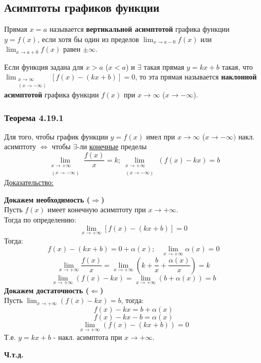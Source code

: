 \documentclass[12pt]{article}
\begin{document}
    \subsection{Асимптоты графиков функции}
    \noindent Прямая $x = a$ называется \textbf{вертикальной асимптотой} графика функции $y = f(x)$, если хотя бы один из пределов $\lim_{x\to a-0} f(x)$ или $\lim_{x\to a + 0} f(x)$ равен $\pm \infty$.\par\noindent
    Если функция задана для $x > a$ ($x < a$) и $\exists$ такая прямая $y = kx+b$ такая, что $\lim_{\substack{x \to \infty\\(x \to -\infty)}} [ f(x) - (kx+b) ] = 0$, то эта прямая называется \textbf{наклонной асимптотой} графика функции $f(x)$ при $x \to \infty$ ($x \to -\infty$).
    
    \subsubsection*{Теорема 4.19.1}\label{th:4.19.1}
    Для того, чтобы график функции $y = f(x)$ имел при $x \to \infty$ ($x \to -\infty)$ накл. асимптоту $\Longleftrightarrow$ чтобы $\exists$-ли \underline{конечные} пределы
    \[ \lim_{\substack{x\to +\infty\\(x \to -\infty)}} \frac{f(x)}{x} = k; \lim_{\substack{x\to +\infty\\(x \to -\infty)}} (f(x) - kx) = b \]
    \underline{Доказательство:}
    \begin{adjustwidth}{1.5em}{1.5em}
        \textbf{Докажем необходимость ($\Rightarrow$)}\\
        Пусть $f(x)$ имеет конечную асимптоту при $x \to +\infty$.\\
        Тогда по определению:
        \[ \lim_{x\to +\infty} [ f(x) - (kx+b) ] = 0 \]
        Тогда:
        \[ f(x) - (kx+b) = 0 + \alpha(x); \;\;\; \lim_{x \to +\infty} \alpha(x) = 0 \]
        \[ \lim_{x \to +\infty}\frac{f(x)}{x} = \lim_{x\to +\infty} (k + \frac{b}{x} + \frac{\alpha(x)}{x}) = k \]
        \[ \lim_{x \to +\infty} (f(x) - kx) = \lim_{x \to +\infty}(b + \alpha(x)) = b \]\noindent
        \textbf{Докажем достаточность ($\Leftarrow$)}\\
        Пусть $\lim_{x\to +\infty} (f(x) - kx) = b$, тогда:
        \[f(x) - kx = b + \alpha(x)\]
        \[f(x) - kx - b = \alpha(x)\]
        \[ \lim_{x\to +\infty} (f(x) - (kx+b)) = 0 \]
        Т.е. $y = kx+b$ - накл. асимптота при $x \to +\infty$.
        \begin{center}
            \textbf{Ч.т.д.}
        \end{center}
    \end{adjustwidth}
    
\end{document}
